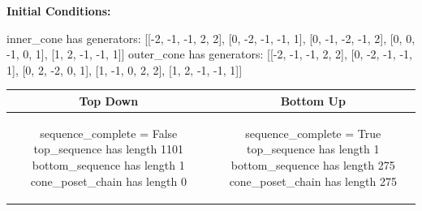 \documentclass[10pt]{article}
\begin{document}
\textbf{Initial Conditions:}
\begin{SAGE}
inner_cone has generators: 
[[-2, -1, -1, 2, 2], [0, -2, -1, -1, 1], [0, -1, -2, -1, 2], [0, 0, -1, 0, 1], [1, 2, -1, -1, 1]]
outer_cone has generators: 
[[-2, -1, -1, 2, 2], [0, -2, -1, -1, 1], [0, 2, -2, 0, 1], [1, -1, 0, 2, 2], [1, 2, -1, -1, 1]]

\end{SAGE}
\begin{tabular}{c|c}
\textbf{Top Down} & \textbf{Bottom Up} \\ \hline  
\begin{SAGE}
sequence_complete = False
top_sequence has length 1101
bottom_sequence has length 1
cone_poset_chain has length 0
\end{SAGE} 
&
\begin{SAGE}
sequence_complete = True
top_sequence has length 1
bottom_sequence has length 275
cone_poset_chain has length 275
\end{SAGE} 
\\ \hline


\end{tabular}
\end{document}
